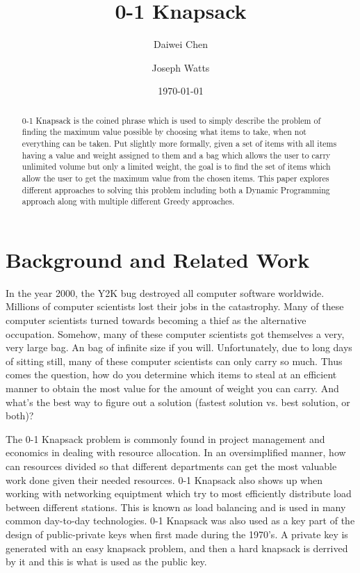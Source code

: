 \documentclass[10pt, letterpaper]{article}
\title{0-1 Knapsack}
\author{Daiwei Chen \and Joseph Watts}
\date{\today}
\begin{document}
\maketitle
\begin{abstract}
0-1 Knapsack is the coined phrase which is used to simply describe the problem of finding the maximum value possible by choosing what items to take, when not everything can be taken.
  Put slightly more formally, given a set of items with all items having a value and weight assigned to them and a bag which allows the user to carry unlimited volume but only a limited weight, the goal is to find the set of items which allow the user to get the maximum value from the chosen items.
  This paper explores different approaches to solving this problem including both a Dynamic Programming approach along with multiple different Greedy approaches.

\end{abstract}

\section{Background and Related Work}
In the year 2000, the Y2K bug destroyed all computer software worldwide. Millions of computer scientists lost their jobs in the catastrophy. Many of these computer scientists turned towards becoming a thief as the alternative occupation. Somehow, many of these computer scientists got themselves a very, very large bag. An bag of infinite size if you will. Unfortunately, due to long days of sitting still, many of these computer scientists can only carry so much. Thus comes the question, how do you determine which items to steal at an efficient manner to obtain the most value for the amount of weight you can carry. And what's the best way to figure out a solution (fastest solution vs. best solution, or both)?
\medskip

\par The 0-1 Knapsack problem is commonly found in project management and economics in dealing with resource allocation. In an oversimplified manner, how can resources divided so that different departments can get the most valuable work done given their needed resources.
0-1 Knapsack also shows up when working with networking equiptment which try to most efficiently distribute load between different stations.
This is known as load balancing and is used in many common day-to-day technologies.
0-1 Knapsack was also used as a key part of the design of public-private keys when first made during the 1970's. A private key is generated with an easy knapsack problem, and then a hard knapsack is derrived by it and this is what is used as the public key.
\end{document}
